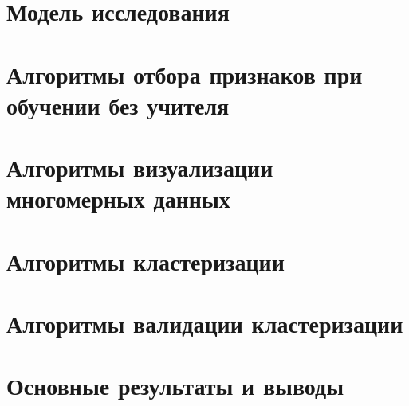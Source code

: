 \section[Модель исследования]{Модель исследования}


\section{Алгоритмы отбора признаков при обучении без учителя}



\section[Алгоритмы визуализации многомерных данных]{%
  Алгоритмы визуализации многомерных данных}



\section[Алгоритмы кластеризации]{%
  Алгоритмы кластеризации}




\section[Алгоритмы валидации кластеризации]{%
  Алгоритмы валидации кластеризации}



\section[Основные результаты и выводы]{%
  Основные результаты и выводы}

